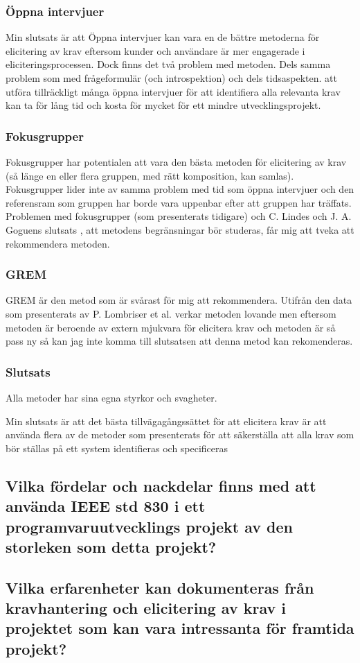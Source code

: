 \subsubsection{Öppna intervjuer}
Min slutsats är att Öppna intervjuer kan vara en de bättre metoderna för elicitering av krav eftersom kunder och användare är mer engagerade i eliciteringsprocessen. Dock finns det två problem med metoden. Dels samma problem som med frågeformulär (och introspektion) och dels tidsaspekten. att utföra tillräckligt många öppna intervjuer för att identifiera alla relevanta krav kan ta för lång tid och kosta för mycket för ett mindre utvecklingsprojekt.

\subsubsection{Fokusgrupper}
Fokusgrupper har potentialen att vara den bästa metoden för elicitering av krav (så länge en eller flera gruppen, med rätt komposition, kan samlas). Fokusgrupper lider inte av samma problem med tid som öppna intervjuer och den referensram som gruppen har borde vara uppenbar efter att gruppen har träffats. Problemen med fokusgrupper (som presenterats tidigare) och C. Lindes och J. A. Goguens slutsats \cite{goguen1993techniques}, att metodens begränsningar bör studeras, får mig att tveka att rekommendera metoden.

\subsubsection{GREM}
GREM är den metod som är svårast för mig att rekommendera. Utifrån den data som presenterats av P. Lombriser et al. verkar metoden lovande men eftersom metoden är beroende av extern mjukvara för elicitera krav och metoden är så pass ny så kan jag inte komma till slutsatsen att denna metod kan rekomenderas.

\subsubsection{Slutsats}
Alla metoder har sina egna styrkor och svagheter.

Min slutsats är att det bästa tillvägagångssättet för att elicitera krav är att använda flera av de metoder som presenterats för att säkerställa att alla krav som bör ställas på ett system identifieras och specificeras        

\subsection{Vilka fördelar och nackdelar finns med att använda IEEE std 830 i ett programvaruutvecklings projekt av den storleken som detta projekt?}
\subsection{Vilka erfarenheter kan dokumenteras från kravhantering och elicitering av krav i projektet som kan vara intressanta för framtida projekt?}



